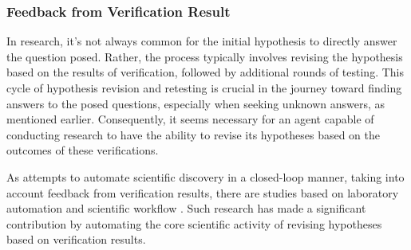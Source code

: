 


\subsubsection{Feedback from Verification Result}

In research, it's not always common for the initial hypothesis to directly answer the question posed. Rather, the process typically involves revising the hypothesis based on the results of verification, followed by additional rounds of testing. This cycle of hypothesis revision and retesting is crucial in the journey toward finding answers to the posed questions, especially when seeking unknown answers, as mentioned earlier. Consequently, it seems necessary for an agent capable of conducting research to have the ability to revise its hypotheses based on the outcomes of these verifications.

As attempts to automate scientific discovery in a closed-loop manner, taking into account feedback from verification results, there are studies based on laboratory automation \cite{king2004functional} and scientific workflow \cite{gil2022will}. Such research has made a significant contribution by automating the core scientific activity of revising hypotheses based on verification results.

